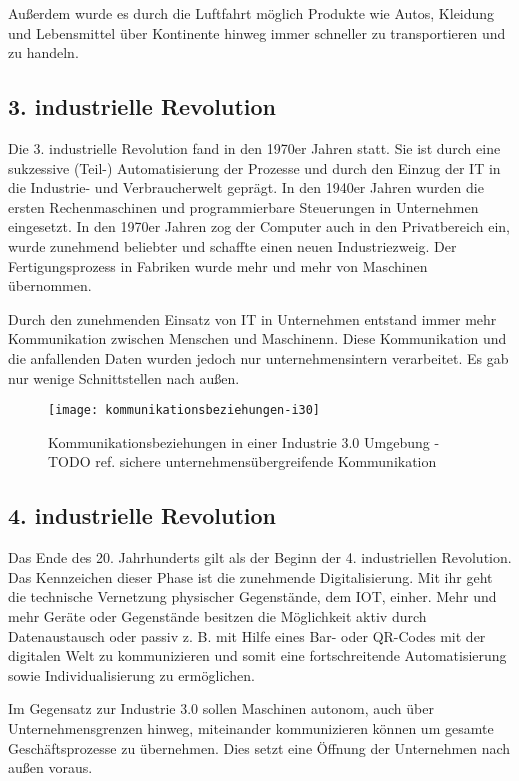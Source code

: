 Außerdem wurde es durch die Luftfahrt möglich Produkte wie Autos, Kleidung und Lebensmittel über Kontinente hinweg immer schneller zu transportieren und zu handeln.

\subsection{3. industrielle Revolution}

Die 3. industrielle Revolution fand in den 1970er Jahren statt. Sie ist durch eine sukzessive (Teil-) Automatisierung der Prozesse und durch den Einzug der IT in die Industrie- und Verbraucherwelt geprägt. In den 1940er Jahren wurden die ersten Rechenmaschinen und programmierbare Steuerungen in Unternehmen eingesetzt. In den 1970er Jahren zog der Computer auch in den Privatbereich ein, wurde zunehmend beliebter und schaffte einen neuen Industriezweig. Der Fertigungsprozess in Fabriken wurde mehr und mehr von Maschinen übernommen.

Durch den zunehmenden Einsatz von IT in Unternehmen entstand immer mehr Kommunikation zwischen Menschen und Maschinenn. Diese Kommunikation und die anfallenden Daten wurden jedoch nur unternehmensintern verarbeitet. Es gab nur wenige Schnittstellen nach außen.

\begin{figure}[h]
  \centering
  \texttt{[image: kommunikationsbeziehungen-i30]}
  \caption{Kommunikationsbeziehungen in einer Industrie 3.0 Umgebung - TODO ref. sichere unternehmensübergreifende Kommunikation}
  \label{Kap2:Industrie3.0-Kommunikation}
\end{figure}

\clearpage

\subsection{4. industrielle Revolution}

Das Ende des 20. Jahrhunderts gilt als der Beginn der 4. industriellen Revolution. Das Kennzeichen dieser Phase ist die zunehmende Digitalisierung. Mit ihr geht die technische Vernetzung physischer Gegenstände, dem \ac{IOT}, einher. Mehr und mehr Geräte oder Gegenstände besitzen die Möglichkeit aktiv durch Datenaustausch oder passiv z. B. mit Hilfe eines Bar- oder QR-Codes mit der digitalen Welt zu kommunizieren und somit eine fortschreitende Automatisierung sowie Individualisierung zu ermöglichen.

Im Gegensatz zur Industrie 3.0 sollen Maschinen autonom, auch über Unternehmensgrenzen hinweg, miteinander kommunizieren können um gesamte Geschäftsprozesse zu übernehmen. Dies setzt eine Öffnung der Unternehmen nach außen voraus.

